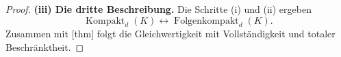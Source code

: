 \begin{proof}
\medskip\noindent\textbf{(iii) Die dritte Beschreibung.}
Die Schritte (i) und (ii) ergeben
\[
 \operatorname{Kompakt}_d(K)\leftrightarrow
 \operatorname{Folgenkompakt}_d(K).
\]
Zusammen mit [thm]
folgt die Gleichwertigkeit mit Vollständigkeit und totaler Beschränktheit.
\end{proof}
